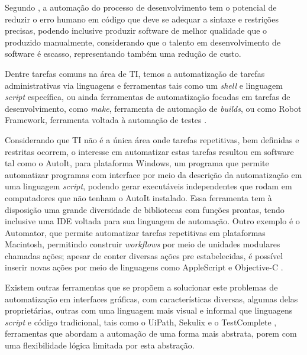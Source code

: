 \documentclass[12pt]{article}
\begin{document}
	Segundo \citeauthor{automionSoftEvolutionEffect}\cite{automionSoftEvolutionEffect}, a automação do processo de desenvolvimento tem o potencial de reduzir o erro humano em código que deve se adequar a sintaxe e restrições precisas, podendo inclusive produzir software de melhor qualidade que o produzido manualmente, considerando que o talento em desenvolvimento de software é escasso, representando também uma redução de custo. 
	
	Dentre tarefas comuns na área de TI, temos a automatização de tarefas administrativas via linguagens e ferramentas tais como um \emph{shell} e linguagem \emph{script} específica, ou ainda ferramentas de automatização focadas em tarefas de desenvolvimento, como \emph{make}, ferramenta de automação de \emph{builds}, ou como Robot Framework, ferramenta voltada à automação de testes \cite{shell,make,robotFW}.

	Considerando que TI não é a única área onde tarefas repetitivas, bem definidas e restritas ocorrem, o interesse em automatizar estas tarefas resultou em software tal como o AutoIt\cite{autoit}, para plataforma Windows, um programa que permite automatizar programas com interface por meio da descrição da automatização em uma linguagem \emph{script}, podendo gerar executáveis independentes que rodam em computadores que não tenham o AutoIt instalado. Essa ferramenta tem à disposição uma grande diversidade de bibliotecas com funções prontas, tendo inclusive uma IDE voltada para sua linguagem de automação. Outro exemplo é o Automator, que permite automatizar tarefas repetitivas em plataformas Macintosh, permitindo construir \emph{workflows} por meio de unidades modulares chamadas ações; apesar de conter diversas ações pre estabelecidas, é possível inserir novas ações por meio de linguagens como AppleScript e Objective-C \cite{automator}.
	
	Existem outras ferramentas que se propõem a solucionar este problemas de automatização em interfaces gráficas, com características diversas, algumas delas proprietárias, outras com uma linguagem mais visual e informal que linguagens \emph{script} e código tradicional, tais como o UiPath, Sekulix e o TestComplete \cite{uipath,testcomplete,sikuli}, ferramentas que abordam a automação de uma forma mais abstrata, porem com uma flexibilidade lógica limitada por esta abstração. 
	
\end{document}
